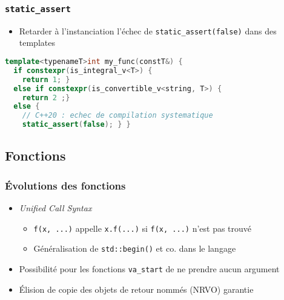 \documentclass[C++.tex]{subfiles}
\begin{document}
\begin{frame}[fragile]
	\frametitle{\lstinline|static_assert|}
	\begin{itemize}
		\item Retarder à l'instanciation l'échec de \lstinline|static_assert(false)| dans des templates
	\end{itemize}

	\begin{lstlisting}[language=C++]
template<typenameT>int my_func(constT&) {
  if constexpr(is_integral_v<T>) {
    return 1; } 
  else if constexpr(is_convertible_v<string, T>) {
    return 2 ;}
  else {
    // C++20 : echec de compilation systematique
    static_assert(false); } }\end{lstlisting}

\end{frame}

\subsection*{Fonctions}
\begin{frame}[fragile]
	\frametitle{Évolutions des fonctions}
	\begin{itemize}
		\item \textit{Unified Call Syntax}
		\begin{itemize}
			\item \lstinline|f(x, ...)| appelle \lstinline|x.f(...)| si \lstinline|f(x, ...)| n'est pas trouvé
			\item Généralisation de \lstinline|std::begin()| et co. dans le langage
		\end{itemize}
		\item Possibilité pour les fonctions \lstinline|va_start| de ne prendre aucun argument
		\item Élision de copie des objets de retour nommés (NRVO) garantie

	\end{itemize}
\end{frame}
\end{document}
